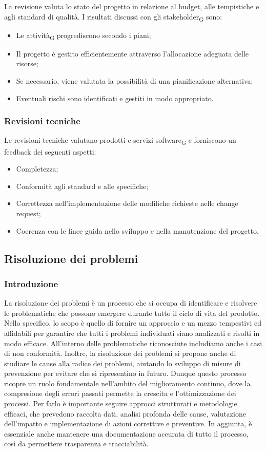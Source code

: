 La revisione valuta lo stato del progetto in relazione al budget, alle tempistiche e agli standard di qualità. I risultati discussi con gli
{stakeholder\textsubscript{G}} sono:
\begin{itemize}
    \item Le {attività\textsubscript{G}} progrediscono secondo i piani;
    \item Il progetto è gestito efficientemente attraverso l'allocazione adeguata delle risorse;
    \item Se necessario, viene valutata la possibilità di una pianificazione alternativa;
    \item Eventuali rischi sono identificati e gestiti in modo appropriato.
\end{itemize}

\subsubsection{Revisioni tecniche}
Le revisioni tecniche valutano prodotti e servizi {software\textsubscript{G}} e forniscono un feedback dei seguenti aspetti:
\begin{itemize}
    \item Completezza;
    \item Conformità agli standard e alle specifiche;
    \item Correttezza nell'implementazione delle modifiche richieste nelle change request;
    \item Coerenza con le linee guida nello sviluppo e nella manutenzione del progetto.
\end{itemize}

\subsection{Risoluzione dei problemi}
\subsubsection{Introduzione}
La risoluzione dei problemi è un processo che si occupa di identificare e risolvere le problematiche che possono emergere durante tutto il ciclo
di vita del prodotto. Nello specifico, lo scopo è quello di fornire un approccio e un mezzo tempestivi ed affidabili per garantire che tutti
i problemi individuati siano analizzati e risolti in modo efficace. All'interno delle problematiche riconosciute includiamo anche i casi di non
conformità. Inoltre, la risoluzione dei problemi si propone anche di studiare le cause alla radice dei problemi, aiutando lo sviluppo di misure
di prevenzione per evitare che si ripresentino in futuro. Dunque  questo processo ricopre un ruolo fondamentale nell'ambito del miglioramento
continuo, dove la compresione degli errori passati permette la crescita e l'ottimizzazione dei processi. Per farlo è importante seguire
approcci strutturati e metodologie efficaci, che prevedono raccolta dati, analisi profonda delle cause, valutazione dell'impatto e implementazione
di azioni correttive e preventive. In aggiunta, è essenziale anche mantenere una documentazione accurata di tutto il processo, così da
permettere trasparenza e tracciabilità.

